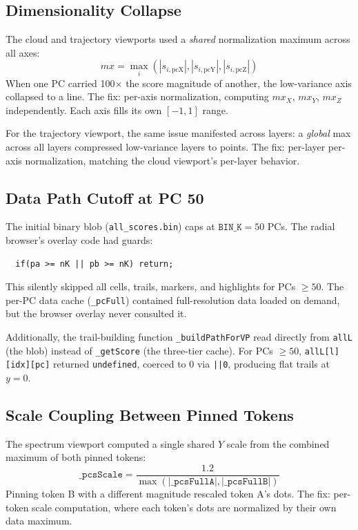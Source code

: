 \documentclass[11pt,a4paper]{article}
\begin{document}
\subsection{Dimensionality Collapse}

The cloud and trajectory viewports used a \emph{shared} normalization maximum across all axes:
\[
  mx = \max_{i} \left( |s_{i,\text{pcX}}|, |s_{i,\text{pcY}}|, |s_{i,\text{pcZ}}| \right)
\]
When one PC carried 100$\times$ the score magnitude of another, the low-variance axis collapsed to a line. The fix: per-axis normalization, computing $mx_X$, $mx_Y$, $mx_Z$ independently. Each axis fills its own $[-1, 1]$ range.

For the trajectory viewport, the same issue manifested across layers: a \emph{global} max across all layers compressed low-variance layers to points. The fix: per-layer per-axis normalization, matching the cloud viewport's per-layer behavior.

\subsection{Data Path Cutoff at PC 50}

The initial binary blob (\texttt{all\_scores.bin}) caps at $\texttt{BIN\_K} = 50$ PCs. The radial browser's overlay code had guards:
\begin{verbatim}
  if(pa >= nK || pb >= nK) return;
\end{verbatim}
This silently skipped all cells, trails, markers, and highlights for PCs $\geq 50$. The per-PC data cache (\texttt{\_pcFull}) contained full-resolution data loaded on demand, but the browser overlay never consulted it.

Additionally, the trail-building function \texttt{\_buildPathForVP} read directly from \texttt{allL} (the blob) instead of \texttt{\_getScore} (the three-tier cache). For PCs $\geq 50$, \texttt{allL[l][idx][pc]} returned \texttt{undefined}, coerced to 0 via \texttt{||0}, producing flat trails at $y=0$.

\subsection{Scale Coupling Between Pinned Tokens}

The spectrum viewport computed a single shared $Y$ scale from the combined maximum of both pinned tokens:
\[
  \texttt{\_pcsScale} = \frac{1.2}{\max(|\texttt{\_pcsFullA}|, |\texttt{\_pcsFullB}|)}
\]
Pinning token B with a different magnitude rescaled token A's dots. The fix: per-token scale computation, where each token's dots are normalized by their own data maximum.
\end{document}
